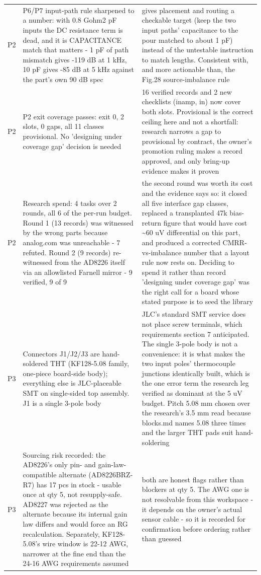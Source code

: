 \documentclass[11pt,a4paper]{article}
\begin{document}
{\begin{longtable}{lp{5.2cm}p{7.2cm}}
P2 & P6/P7 input-path rule sharpened to a number: with 0.8 Gohm\textbar{}\textbar{}2 pF inputs the DC resistance term is dead, and it is CAPACITANCE match that matters - 1 pF of path mismatch gives -119 dB at 1 kHz, 10 pF gives -85 dB at 5 kHz against the part's own 90 dB spec & gives placement and routing a checkable target (keep the two input paths' capacitance to the pour matched to about 1 pF) instead of the untestable instruction to match lengths. Consistent with, and more actionable than, the Fig.28 source-imbalance rule \\
P2 & P2 exit coverage passes: exit 0, 2 slots, 0 gaps, all 11 classes provisional. No 'designing under coverage gap' decision is needed & 16 verified records and 2 new checklists (inamp, in) now cover both slots. Provisional is the correct ceiling here and not a shortfall: research narrows a gap to provisional by contract, the owner's promotion ruling makes a record approved, and only bring-up evidence makes it proven \\
P2 & Research spend: 4 tasks over 2 rounds, all 6 of the per-run budget. Round 1 (13 records) was witnessed by the wrong parts because analog.com was unreachable - 7 refuted. Round 2 (9 records) re-witnessed from the AD8226 itself via an allowlisted Farnell mirror - 9 verified, 9 of 9 & the second round was worth its cost and the evidence says so: it closed all five interface gap classes, replaced a transplanted 47k bias-return figure that would have cost \textasciitilde{}60 uV differential on this part, and produced a corrected CMRR-vs-imbalance number that a layout rule now rests on. Deciding to spend it rather than record 'designing under coverage gap' was the right call for a board whose stated purpose is to seed the library \\
P3 & Connectors J1/J2/J3 are hand-soldered THT (KF128-5.08 family, one-piece board-side body); everything else is JLC-placeable SMT on single-sided top assembly. J1 is a single 3-pole body & JLC's standard SMT service does not place screw terminals, which requirements section 7 anticipated. The single 3-pole body is not a convenience: it is what makes the two input poles' thermocouple junctions identically built, which is the one error term the research leg verified as dominant at the 5 uV budget. Pitch 5.08 mm chosen over the research's 3.5 mm read because blocks.md names 5.08 three times and the larger THT pads suit hand-soldering \\
P3 & Sourcing risk recorded: the AD8226's only pin- and gain-law-compatible alternate (AD8226BRZ-R7) has 17 pcs in stock - usable once at qty 5, not resupply-safe. AD8227 was rejected as the alternate because its internal gain law differs and would force an RG recalculation. Separately, KF128-5.08's wire window is 22-12 AWG, narrower at the fine end than the 24-16 AWG requirements assumed & both are honest flags rather than blockers at qty 5. The AWG one is not resolvable from this workspace - it depends on the owner's actual sensor cable - so it is recorded for confirmation before ordering rather than guessed \\

\end{longtable}}
\end{document}

